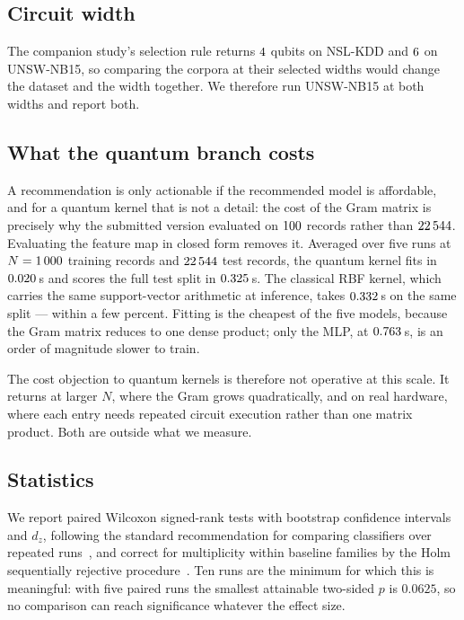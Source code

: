 \documentclass[journal]{IEEEtran}
\begin{document}
\subsection{Circuit width}
The companion study's selection rule returns $4$ qubits on
NSL-KDD and $6$ on UNSW-NB15, so comparing the corpora at their
selected widths would change the dataset and the width together. We
therefore run UNSW-NB15 at both widths and report both.

\subsection{What the quantum branch costs}
A recommendation is only actionable if the recommended model is affordable,
and for a quantum kernel that is not a detail: the cost of the Gram matrix
is precisely why the submitted version evaluated on
$100$ records rather than $22\,544$. Evaluating the feature map in
closed form removes it. Averaged over five runs at $N=1\,000$ training
records and $22\,544$ test records, the quantum kernel fits in
$0.020$\,s and scores the full test split in $0.325$\,s.
The classical RBF kernel, which carries the same support-vector arithmetic
at inference, takes $0.332$\,s on the same split --- within a few
percent. Fitting is the cheapest of the five models, because the Gram
matrix reduces to one dense product; only the MLP, at $0.763$\,s, is
an order of magnitude slower to train.

The cost objection to quantum kernels is therefore not operative at this
scale. It returns at larger $N$, where the Gram grows quadratically, and on
real hardware, where each entry needs repeated circuit execution rather
than one matrix product. Both are outside what we measure.

\subsection{Statistics}
We report paired Wilcoxon signed-rank tests with bootstrap confidence
intervals and $d_z$, following the standard recommendation for comparing
classifiers over repeated runs~\cite{demsar2006statistical}, and correct
for multiplicity within baseline families by the Holm sequentially
rejective procedure~\cite{holm1979simple}. Ten runs are the minimum for
which this is meaningful: with five paired runs the smallest attainable
two-sided $p$ is $0.0625$, so no comparison can reach significance
whatever the effect size.
\end{document}
